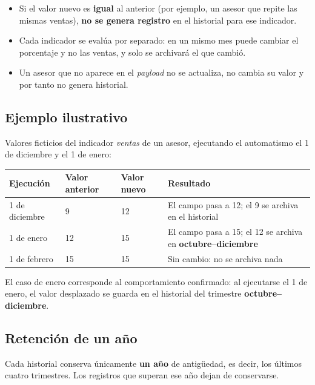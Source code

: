 \documentclass[11pt,a4paper]{article}
\begin{document}
\begin{itemize}[nosep]
  \item Si el valor nuevo es \textbf{igual} al anterior (por ejemplo, un asesor que repite las mismas ventas), \textbf{no se genera registro} en el historial para ese indicador.
  \item Cada indicador se evalúa por separado: en un mismo mes puede cambiar el porcentaje y no las ventas, y solo se archivará el que cambió.
  \item Un asesor que no aparece en el \emph{payload} no se actualiza, no cambia su valor y por tanto no genera historial.
\end{itemize}

\subsection{Ejemplo ilustrativo}
Valores ficticios del indicador \emph{ventas} de un asesor, ejecutando el automatismo el 1 de diciembre y el 1 de enero:

\begin{center}
\begin{tabular}{@{}p{2.8cm}p{2.2cm}p{2.2cm}p{7.2cm}@{}}
\toprule
\textbf{Ejecución} & \textbf{Valor anterior} & \textbf{Valor nuevo} & \textbf{Resultado}\\
\midrule
1 de diciembre & 9 & 12 & El campo pasa a 12; el 9 se archiva en el historial\\
1 de enero & 12 & 15 & El campo pasa a 15; el 12 se archiva en \textbf{octubre--diciembre}\\
1 de febrero & 15 & 15 & Sin cambio: no se archiva nada\\
\bottomrule
\end{tabular}
\end{center}

El caso de enero corresponde al comportamiento confirmado: al ejecutarse el 1 de enero, el valor desplazado se guarda en el historial del trimestre \textbf{octubre--diciembre}.

\subsection{Retención de un año}
Cada historial conserva únicamente \textbf{un año} de antigüedad, es decir, los últimos cuatro trimestres. Los registros que superan ese año dejan de conservarse.
\end{document}
